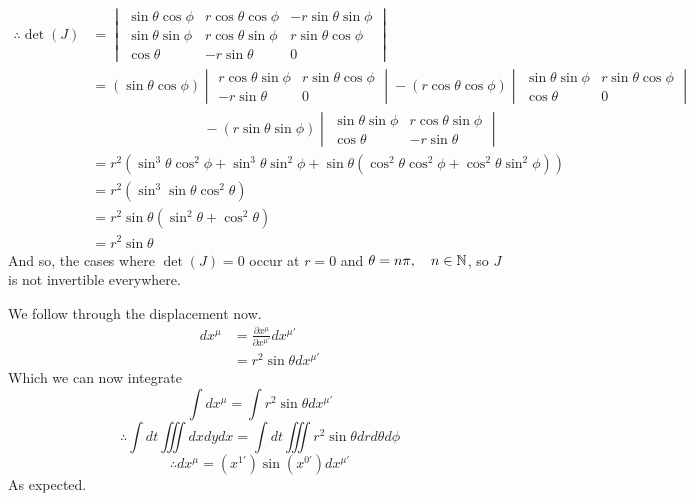 \documentclass{article}
\begin{document}
	\begin{align*}
		\therefore \det(J) &=
		\begin{vmatrix}
			\sin \theta \cos \phi & r \cos \theta \cos \phi & -r \sin \theta \sin \phi \\
			\sin \theta \sin \phi & r \cos \theta \sin \phi & r \sin \theta \cos\phi \\
			\cos \theta & -r \sin \theta & 0
		\end{vmatrix}  \\
		&= (\sin \theta \cos \phi) 
		\begin{vmatrix}
			 r \cos \theta \sin \phi & r \sin \theta \cos\phi \\
			 -r \sin \theta & 0
		\end{vmatrix}
		- ( r \cos \theta \cos \phi)
		\begin{vmatrix}
				\sin \theta \sin \phi &  r \sin \theta \cos\phi \\
				\cos \theta & 0
		\end{vmatrix}
		\\
		&\quad\quad\quad\quad\quad\quad\quad\quad- (r \sin \theta \sin \phi)
		\begin{vmatrix}
			\sin \theta \sin \phi & r \cos \theta \sin \phi \\
			\cos \theta & -r \sin \theta
		\end{vmatrix} \\
		&= r^2 \left( \sin^3 \theta \cos^2 \phi + \sin^3 \theta \sin^2 \phi + \sin \theta \left(\cos^2 \theta \cos^2 \phi + \cos^2 \theta \sin^2 \phi \right)\right) \\
		&= r^2 \left( \sin^3 \sin \theta \cos^2 \theta \right) \\
		&= r^2 \sin \theta \left(\sin^2 \theta + \cos^2 \theta\right) \\
		&= r^2 \sin \theta
	\end{align*}
	And so, the cases where $\det(J) = 0$ occur at $r=0$ and $\theta = n\pi, \quad n \in \mathbb{N}$, so $J$ is not invertible everywhere. 
	
	We follow through the displacement now.
	\begin{align*}
		dx^\mu &= \frac{\partial x^\mu}{\partial x^{\mu '}} d x^{\mu'} \\
			&= r^2 \sin\theta dx^{\mu '}
	\end{align*}
	Which we can now integrate
	$$ \int dx^\mu = \int r^2 \sin \theta dx^{\mu '} $$
	$$ \therefore \int dt \iiint dxdydx = \int dt \iiint r^2 \sin \theta dr d\theta d\phi$$
	$$ \therefore dx^\mu = (x^{1'}) \sin (x^{0'}) dx^{\mu '} $$
	As expected.
\end{document}
